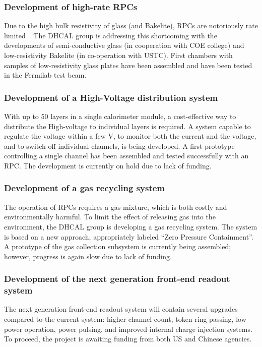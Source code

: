 \subsubsection{Development of high-rate RPCs}
Due to the high bulk resistivity of glass (and Bakelite), RPCs are notoriously rate limited~\cite{Bilki:2013:CAN42}. The DHCAL group is addressing this shortcoming with the developments of semi-conductive glass (in cooperation with COE college) and low-resistivity Bakelite (in co-operation with USTC). First chambers with samples of low-resistivity glass plates have been assembled and have been tested in the Fermilab test beam.
\subsubsection{Development of a High-Voltage distribution system}
With up to 50 layers in a single calorimeter module, a cost-effective way to distribute the High-voltage to individual layers is required. A system capable to regulate the voltage within a few \unit[100]{V}, to monitor both the current and the voltage, and to switch off individual channels, is being developed. A first prototype controlling a single channel has been assembled and tested successfully with an RPC. The development is currently on hold due to lack of funding.
\subsubsection{Development of a gas recycling system}
The operation of RPCs requires a gas mixture, which is both costly and environmentally harmful. To limit the effect of releasing gas into the environment, the DHCAL group is developing a gas recycling system. The system is based on a new approach, appropriately labeled ``Zero Pressure Containment''. A prototype of the gas collection subsystem is currently being assembled; however, progress is again slow due to lack of funding.
\subsubsection{Development of the next generation front-end readout system}
The next generation front-end readout system will contain several upgrades compared to the current system: higher channel count, token ring passing, low power operation, power pulsing, and improved internal charge injection systems. To proceed, the project is awaiting funding from both US and Chinese agencies.

